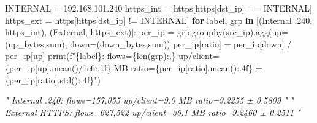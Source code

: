 \documentclass[
  11pt,
]{article}
\newenvironment{Shaded}{\vspace{4pt}}{\vspace{4pt}}
\newcommand{\BuiltInTok}[1]{\textcolor[rgb]{0.00,0.50,0.00}{#1}}
\newcommand{\CommentTok}[1]{\textcolor[rgb]{0.38,0.63,0.69}{\textit{#1}}}
\newcommand{\ControlFlowTok}[1]{\textcolor[rgb]{0.00,0.44,0.13}{\textbf{#1}}}
\newcommand{\FloatTok}[1]{\textcolor[rgb]{0.25,0.63,0.44}{#1}}
\newcommand{\KeywordTok}[1]{\textcolor[rgb]{0.00,0.44,0.13}{\textbf{#1}}}
\newcommand{\NormalTok}[1]{#1}
\newcommand{\OperatorTok}[1]{\textcolor[rgb]{0.40,0.40,0.40}{#1}}
\newcommand{\SpecialCharTok}[1]{\textcolor[rgb]{0.25,0.44,0.63}{#1}}
\newcommand{\SpecialStringTok}[1]{\textcolor[rgb]{0.73,0.40,0.53}{#1}}
\newcommand{\StringTok}[1]{\textcolor[rgb]{0.25,0.44,0.63}{#1}}
\begin{document}
\begin{Shaded}
\begin{Highlighting}[]
\NormalTok{INTERNAL }\OperatorTok{=} \StringTok{\textquotesingle{}192.168.101.240\textquotesingle{}}
\NormalTok{https\_int }\OperatorTok{=}\NormalTok{ https[https[}\StringTok{\textquotesingle{}dst\_ip\textquotesingle{}}\NormalTok{] }\OperatorTok{==}\NormalTok{ INTERNAL]}
\NormalTok{https\_ext }\OperatorTok{=}\NormalTok{ https[https[}\StringTok{\textquotesingle{}dst\_ip\textquotesingle{}}\NormalTok{] }\OperatorTok{!=}\NormalTok{ INTERNAL]}
\ControlFlowTok{for}\NormalTok{ label, grp }\KeywordTok{in}\NormalTok{ [(}\StringTok{\textquotesingle{}Internal .240\textquotesingle{}}\NormalTok{, https\_int), (}\StringTok{\textquotesingle{}External\textquotesingle{}}\NormalTok{, https\_ext)]:}
\NormalTok{  per\_ip }\OperatorTok{=}\NormalTok{ grp.groupby(}\StringTok{\textquotesingle{}src\_ip\textquotesingle{}}\NormalTok{).agg(up}\OperatorTok{=}\NormalTok{(}\StringTok{\textquotesingle{}up\_bytes\textquotesingle{}}\NormalTok{,}\StringTok{\textquotesingle{}sum\textquotesingle{}}\NormalTok{), down}\OperatorTok{=}\NormalTok{(}\StringTok{\textquotesingle{}down\_bytes\textquotesingle{}}\NormalTok{,}\StringTok{\textquotesingle{}sum\textquotesingle{}}\NormalTok{))}
\NormalTok{  per\_ip[}\StringTok{\textquotesingle{}ratio\textquotesingle{}}\NormalTok{] }\OperatorTok{=}\NormalTok{ per\_ip[}\StringTok{\textquotesingle{}down\textquotesingle{}}\NormalTok{] }\OperatorTok{/}\NormalTok{ per\_ip[}\StringTok{\textquotesingle{}up\textquotesingle{}}\NormalTok{]}
  \BuiltInTok{print}\NormalTok{(}\SpecialStringTok{f"}\SpecialCharTok{\{}\NormalTok{label}\SpecialCharTok{\}}\SpecialStringTok{: flows=}\SpecialCharTok{\{}\BuiltInTok{len}\NormalTok{(grp)}\SpecialCharTok{:,\}}\SpecialStringTok{  up/client=}\SpecialCharTok{\{}\NormalTok{per\_ip[}\StringTok{\textquotesingle{}up\textquotesingle{}}\NormalTok{]}\SpecialCharTok{.}\NormalTok{mean()}\OperatorTok{/}\FloatTok{1e6}\SpecialCharTok{:.1f\}}\SpecialStringTok{ MB  ratio=}\SpecialCharTok{\{}\NormalTok{per\_ip[}\StringTok{\textquotesingle{}ratio\textquotesingle{}}\NormalTok{]}\SpecialCharTok{.}\NormalTok{mean()}\SpecialCharTok{:.4f\}}\SpecialStringTok{ ± }\SpecialCharTok{\{}\NormalTok{per\_ip[}\StringTok{\textquotesingle{}ratio\textquotesingle{}}\NormalTok{]}\SpecialCharTok{.}\NormalTok{std()}\SpecialCharTok{:.4f\}}\SpecialStringTok{"}\NormalTok{)}

\CommentTok{" Internal .240:  flows=157,055  up/client=9.0 MB   ratio=9.2255 ± 0.5809 "}
\CommentTok{" External HTTPS: flows=627,522  up/client=36.1 MB  ratio=9.2460 ± 0.2511 "}
\end{Highlighting}
\end{Shaded}
\end{document}
